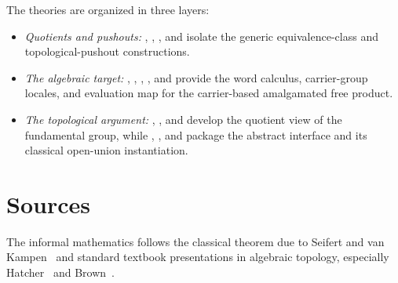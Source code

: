 \documentclass[11pt,a4paper]{article}
\begin{document}
The theories are organized in three layers:
\begin{itemize}
\item \emph{Quotients and pushouts:} ,
  , , and
   isolate the generic equivalence-class
  and topological-pushout constructions.
\item \emph{The algebraic target:} ,
  , ,
  , and
   provide the word calculus,
  carrier-group locales, and evaluation map for the carrier-based amalgamated
  free product.
\item \emph{The topological argument:}
  ,
  , and
   develop the quotient view of the
  fundamental group, while ,
  , and
   package the abstract interface and
  its classical open-union instantiation.
\end{itemize}

\section{Sources}

The informal mathematics follows the classical theorem due to Seifert and van
Kampen~\cite{Seifert1931,vanKampen1933} and standard textbook presentations in
algebraic topology, especially Hatcher~\cite{Hatcher2002} and
Brown~\cite{Brown2006}.

\tableofcontents

\sloppy

\fussy



\end{document}
